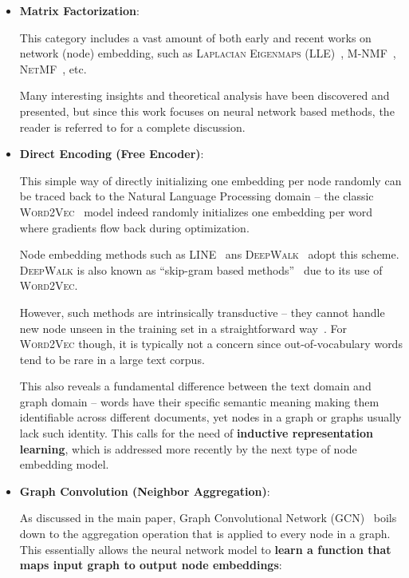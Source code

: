 \documentclass{article}
\newcommand{\wv}{\textsc{Word2Vec}\xspace}
\newcommand{\gcn}{\textsc{GCN}\xspace}
\begin{document}
\begin{itemize}
    \item \textbf{{Matrix Factorization}}:
    
    This category includes a vast amount of both early and recent works on network (node) embedding, such as \textsc{Laplacian Eigenmaps (LLE)}~\cite{belkin2003laplacian}, \textsc{M-NMF}~\cite{wang2017community}, \textsc{NetMF}~\cite{qiu2017network}, etc. 
    
    Many interesting insights and theoretical analysis have been discovered and presented, but since this work focuses on neural network based methods, the reader is referred to \cite{qiu2017network} for a complete discussion.
    
    \item \textbf{{Direct Encoding (Free Encoder)}}: 
    
    This simple way of directly initializing one embedding per node randomly can be traced back to the Natural Language Processing domain -- the classic \wv~\cite{mikolov2013distributed} model indeed randomly initializes one embedding per word where gradients flow back during optimization. 
    
    Node embedding methods such as \textsc{LINE}~\cite{tang2015line} ans \textsc{DeepWalk}~\cite{perozzi2014deepwalk} adopt this scheme. \textsc{DeepWalk} is also known as ``skip-gram based methods''~\cite{du2018dynamic} due to its use of \wv.
    
    However, such methods are intrinsically transductive -- they cannot handle new node unseen in the training set in a straightforward way~\cite{hamilton2017inductive}. For \wv though, it is typically not a concern since out-of-vocabulary words tend to be rare in a large text corpus. 
    
    This also reveals a fundamental difference between the text domain and graph domain -- words have their specific semantic meaning making them identifiable across different documents, yet nodes in a graph or graphs usually lack such identity. This calls for the need of \textbf{{inductive representation learning}}, which is addressed more recently by the next type of node embedding model.
    
    \item \textbf{{Graph Convolution (Neighbor Aggregation)}}: 
    
    As discussed in the main paper, Graph Convolutional Network (\gcn)~\cite{defferrard2016convolutional} boils down to the aggregation operation that is applied to every node in a graph. This essentially allows the neural network model to \textbf{{learn a function that maps input graph to output node embeddings}}:
    

\end{itemize}
\end{document}
